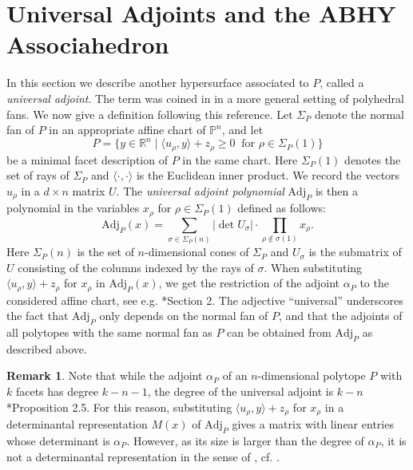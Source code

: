 \documentclass[a4paper,10pt]{amsart}
\theoremstyle{definition}
\newtheorem{rem}[Def]{Remark}
\theoremstyle{plain}
\begin{document}
\section{Universal Adjoints and the ABHY Associahedron} \label{sec:6}
In this section we describe another hypersurface associated to $P$, called a \emph{universal adjoint}. The term was coined in \cite{telen2025toric} in a more general setting of polyhedral fans. We now give a definition following this reference. Let $\Sigma_P$ denote the normal fan of $P$ in an appropriate affine chart of $\mathbb{P}^n$, and let 
\begin{equation*}
P = \{y\in \mathbb{R}^n\mid \langle u_\rho , y\rangle + z_\rho \geq 0\ \text{ for } \rho\in\Sigma_P(1)\}    
\end{equation*}
 be a minimal facet description of $P$ in the same chart. Here $\Sigma_P(1)$ denotes the set of rays of $\Sigma_P$ and $\langle \cdot,\cdot\rangle$ is the Euclidean inner product. We record the vectors $u_\rho$ in a $d \times n$ matrix $U$. The \emph{universal adjoint polynomial} $\mathrm{Adj}_P$ is then a polynomial in the variables $x_\rho$ for $\rho\in \Sigma_P(1)$ defined as follows:
$$\mathrm{Adj}_P(x) = \sum_{\sigma \in \Sigma_P(n)} |\det U_\sigma|\cdot\prod_{\rho\not\in\sigma(1)} x_\rho.$$
Here $\Sigma_P(n)$ is the set of $n$-dimensional cones of $\Sigma_P$ and $U_\sigma$ is the submatrix of $U$ consisting of the columns indexed by the rays of $\sigma$.
When substituting $\langle u_\rho , y\rangle + z_\rho$ for $x_\rho$ in $\mathrm{Adj}_P(x)$, we get the restriction of the adjoint $\alpha_P$ to the considered affine chart, see e.g. \cite{PavlovTelen2024PosGeom}*{Section 2}. The adjective ``universal'' underscores the fact that $\mathrm{Adj}_P$ only depends on the normal fan of $P$, and that the adjoints of all polytopes with the same normal fan as $P$ can be obtained from $\mathrm{Adj}_P$ as described above.

\begin{rem}
Note that while the adjoint $\alpha_P$ of an $n$-dimensional polytope $P$ with $k$ facets has degree $k-n-1$, the degree of the universal adjoint is $k-n$ \cite{PavlovTelen2024PosGeom}*{Proposition 2.5}. For this reason, substituting $\langle u_\rho , y\rangle + z_\rho$ for $x_\rho$ in a determinantal representation $M(x)$ of $\mathrm{Adj}_P$ gives a matrix with linear entries whose determinant is $\alpha_P$. However, as its size is larger than the degree of $\alpha_P$, it is not a determinantal representation in the sense of , cf. .
\end{rem}
\end{document}
